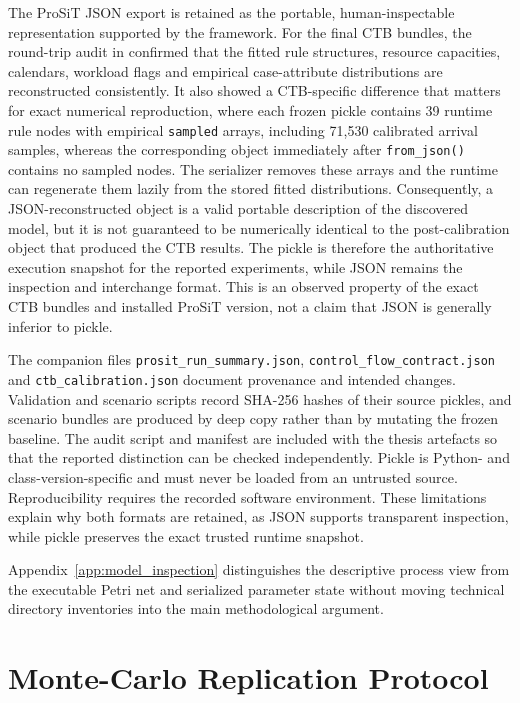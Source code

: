 The ProSiT JSON export is retained as the portable, human-inspectable
representation supported by the framework. For the final CTB bundles,
the round-trip audit in
confirmed that the fitted rule structures, resource capacities, calendars,
workload flags and empirical case-attribute distributions are reconstructed
consistently. It also showed a CTB-specific difference that matters for exact
numerical reproduction, where each frozen pickle contains 39 runtime rule nodes
with empirical \texttt{sampled} arrays, including 71,530 calibrated arrival
samples, whereas the corresponding object immediately after
\texttt{from\_json()} contains no sampled nodes. The serializer removes these
arrays and the runtime can regenerate them lazily from the stored fitted
distributions. Consequently, a JSON-reconstructed object is a valid portable
description of the discovered model, but it is not guaranteed to be
numerically identical to the post-calibration object that produced the CTB
results. The pickle is therefore the authoritative execution snapshot for
the reported experiments, while JSON remains the inspection and interchange
format. This is an observed property of the exact CTB bundles and installed
ProSiT version, not a claim that JSON is generally inferior to pickle.

The companion files \texttt{prosit\_run\_summary.json},
\texttt{control\_flow\_contract.json} and
\texttt{ctb\_calibration.json} document provenance and intended changes.
Validation and scenario scripts record SHA-256 hashes of their source
pickles, and scenario bundles are produced by deep copy rather than by
mutating the frozen baseline. The audit script and manifest are included
with the thesis artefacts so that the reported distinction can be checked
independently. Pickle is Python- and class-version-specific and must never
be loaded from an untrusted source. Reproducibility requires the recorded
software environment. These limitations explain why both formats are
retained, as JSON supports transparent inspection, while pickle preserves the
exact trusted runtime snapshot.

Appendix~\ref{app:model_inspection} distinguishes the descriptive process view
from the executable Petri net and serialized parameter state without moving
technical directory inventories into the main methodological argument.

\section{Monte-Carlo Replication Protocol}
\label{sec:mc_protocol}

